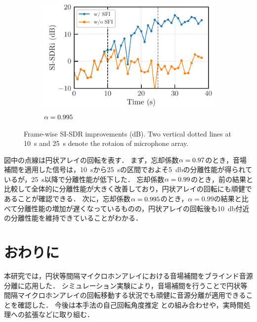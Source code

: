 \documentclass{article}
\begin{document}
\begin{figure}[t]
  \begin{subfigure}[t]{\linewidth}
    \includegraphics{figures/plots/online/Gauss_8000_995.pdf}
    \caption{$\alpha = 0.995$}
  \end{subfigure}
  \caption{Frame-wise SI-SDR improvements (dB). Two vertical dotted lines at \SI{10}{\second} and \SI{25}{\second} denote the rotaion of microphone array.}
  \label{fig:online}
\end{figure}
図中の点線は円状アレイの回転を表す．
まず，忘却係数$\alpha=0.97$のとき，音場補間を適用した信号は，\SI{10}{\second}から\SI{25}{\second}の区間でおよそ\SI{5}{\decibel}の分離性能が得られているが，\SI{25}{\second}以降で分離性能が低下した．
忘却係数$\alpha=0.99$のとき，前の結果と比較して全体的に分離性能が大きく改善しており，円状アレイの回転にも頑健であることが確認できる．
次に，忘却係数$\alpha=0.995$のとき，$\alpha = 0.99$の結果と比べて分離性能の増加が遅くなっているものの，円状アレイの回転後も\SI{10}{\decibel}付近の分離性能を維持できていることがわかる．

\section{おわりに}
本研究では，円状等間隔マイクロホンアレイにおける音場補間をブラインド音源分離に応用した．
シミュレーション実験により，音場補間を行うことで円状等間隔マイクロホンアレイの回転移動する状況でも頑健に音源分離が適用できることを確認した．
今後は本手法の自己回転角度推定 \cite{Lian:2021:APSIPA} との組み合わせや，実時間処理への拡張などに取り組む．

\clearpage\newpage


\end{document}
